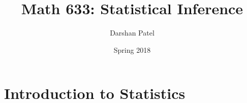 \documentclass[12pt]{article}
\begin{document}
\theoremstyle{definition}
\newtheorem{theorem}{Theorem}[section]
\newtheorem{definition}{Definition}[section]
\newtheorem{example}{Example}[section]
\newtheorem{question}{Question}[section]

\newcommand{\expe}[1]{\mathrm{E}[ #1 ]}
\renewcommand{\var}[1]{\mathrm{Var}[ #1 ]}
\newcommand{\prob}[1]{\mathrm{P}( #1 )}
\newcommand{\bern}[1]{\mathrm{Bernoulli}( #1 )}
\newcommand{\geom}[1]{\text{Geometric}( #1 )}
\newcommand{\binomial}[1]{\text{Binomial}( #1 )}
\newcommand{\gammad}[1]{\text{Gamma}( #1 )}
\newcommand{\invgammad}[1]{\text{InvGamma}( #1 )}
\newcommand{\betad}[1]{\text{Beta}( #1 )}
\newcommand{\expo}[1]{\text{Exponential}( #1 )}
\newcommand{\ftheta}[1]{f_{\theta}( #1 )}
\newcommand{\thetahat}{\hat{\theta}}
\newcommand{\post}[1]{\xi( #1 )}
\newcommand{\set}[1]{\Big\{ #1 \Big\}}


\title{Math 633: Statistical Inference}
\author{Darshan Patel}
\date{Spring 2018}
\maketitle

\tableofcontents

\section{Introduction to Statistics} 
\end{document}
